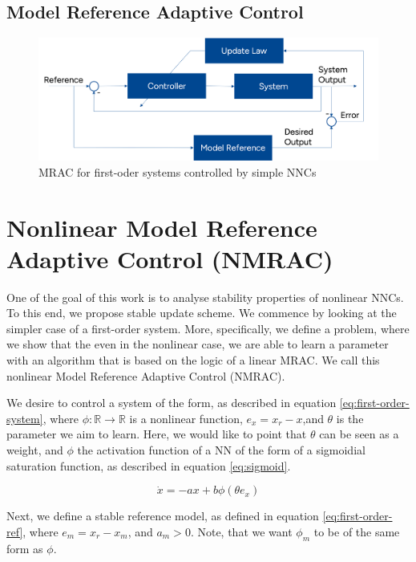 \subsection{Model Reference Adaptive Control}

\begin{figure}[ht]
    \centering
    \includegraphics[width=0.8\linewidth]{images/MRAC_Blockdiagram.png}
    \caption{MRAC for first-oder systems controlled by simple NNCs}
    \label{fig:nonlinear-NNC-MRAC}
\end{figure}

\section{Nonlinear Model Reference Adaptive Control (NMRAC)}
\label{sec:MRAC-Nonlinear-SISO}


One of the goal of this work is to analyse stability properties of nonlinear NNCs. To this end, we propose stable update scheme. We commence by looking at the simpler case of a first-order system. More, specifically, we define a problem, where we show that the even in the nonlinear case, we are able to learn a parameter with an algorithm that is based on the logic of a linear MRAC. We call this nonlinear Model Reference Adaptive Control (NMRAC).

We desire to control a system of the form, as described in equation \eqref{eq:first-order-system}, where $\phi: \mathbb{R}\rightarrow\mathbb{R}$ is a nonlinear function, $e_x=x_r - x$,and $\theta$ is the parameter we aim to learn. Here, we would like to point that $\theta$ can be seen as a weight, and $\phi$ the activation function of a NN of the form of a sigmoidial saturation function, as described in equation \eqref{eq:sigmoid}.

\begin{equation}
    \dot x = -ax + b\phi(\theta e_x)
    \label{eq:first-order-system}
\end{equation}

Next, we define a stable reference model, as defined in equation \eqref{eq:first-order-ref}, where $e_m=x_r - x_m$, and $a_m>0$. Note, that we want $\phi_m$ to be of the same form as $\phi$.

